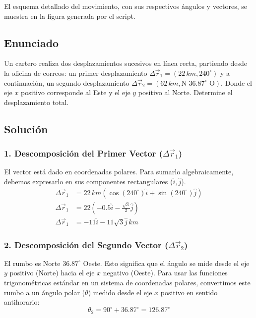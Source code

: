 \documentclass[12pt, a4paper]{article}
\begin{document}
\begin{tcolorbox}[colback=green!5!white, colframe=green!50!black, title=Respuesta Final]
\centering El esquema detallado del movimiento, con sus respectivos ángulos y vectores, se muestra en la figura generada por el script.
\end{tcolorbox}

\newpage

\subsection*{Enunciado}
Un cartero realiza dos desplazamientos sucesivos en línea recta, partiendo desde la oficina de correos: un primer desplazamiento $\Delta\vec{r}_1 = (22 \, \si{km}, 240^\circ)$ y a continuación, un segundo desplazamiento $\Delta\vec{r}_2 = (62 \, \si{km}, \text{N } 36.87^\circ \text{ O})$. Donde el eje $x$ positivo corresponde al Este y el eje $y$ positivo al Norte. Determine el desplazamiento total.

\subsection*{Solución}

\subsubsection*{1. Descomposición del Primer Vector ($\Delta\vec{r}_1$)}
El vector está dado en coordenadas polares. Para sumarlo algebraicamente, debemos expresarlo en sus componentes rectangulares ($\hat{i}, \hat{j}$).
\begin{align*}
    \Delta\vec{r}_1 &= 22 \, \si{km} (\cos(240^\circ) \hat{i} + \sin(240^\circ) \hat{j}) \\
    \Delta\vec{r}_1 &= 22 \left(-0.5 \hat{i} - \frac{\sqrt{3}}{2} \hat{j}\right) \\
    \Delta\vec{r}_1 &= -11\hat{i} - 11\sqrt{3}\hat{j} \, \si{km}
\end{align*}

\subsubsection*{2. Descomposición del Segundo Vector ($\Delta\vec{r}_2$)}
El rumbo es Norte $36.87^\circ$ Oeste. Esto significa que el ángulo se mide desde el eje $y$ positivo (Norte) hacia el eje $x$ negativo (Oeste). Para usar las funciones trigonométricas estándar en un sistema de coordenadas polares, convertimos este rumbo a un ángulo polar ($\theta$) medido desde el eje $x$ positivo en sentido antihorario:
$$\theta_2 = 90^\circ + 36.87^\circ = 126.87^\circ$$
\end{document}
